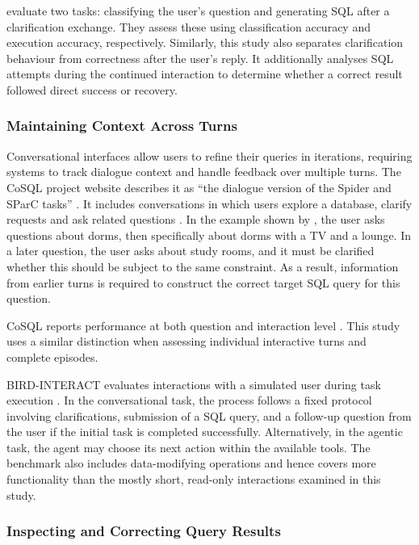 \citet[Section~4]{dong2025practiq} evaluate two tasks:
classifying the user's question and generating SQL after a clarification
exchange. They assess these using classification accuracy and execution
accuracy, respectively.
Similarly, this study also separates clarification behaviour
from correctness after the user's reply.
It additionally analyses SQL attempts during the continued interaction
to determine whether a correct result followed direct success or recovery.

\subsubsection{Maintaining Context Across Turns}

Conversational interfaces allow users to refine their queries in iterations,
requiring systems to track dialogue context and handle feedback over multiple turns.
The CoSQL project website describes it as ``the dialogue version of the
Spider and SParC tasks'' \citep[What is CoSQL?]{cosqlWebsite}.
It includes conversations in which users explore a database, clarify
requests and ask related questions \citep{yu2019cosql}.
In the example shown by \citet[p.~1962, Figure~1]{yu2019cosql},
the user asks questions about dorms, then specifically about dorms with a TV and a lounge.
In a later question, the user asks about study rooms, 
and it must be clarified whether this should be subject to the same constraint. 
As a result, information from earlier turns is required to construct the correct target SQL query for this question.

CoSQL reports performance at both question and interaction level
\citep[Section~6, Table~5]{yu2019cosql}.
This study uses a similar distinction when assessing individual
interactive turns and complete episodes.

BIRD-INTERACT evaluates interactions with a simulated user during task execution
\citep{huo2026birdinteract}.
In the conversational task, the process follows a fixed protocol involving clarifications,
submission of a SQL query, and a follow-up question from the user if the initial task is completed successfully.
Alternatively, in the agentic task, the agent may choose its next action within the available tools.
The benchmark also includes data-modifying operations and hence covers more functionality than the mostly short, read-only interactions
examined in this study.

\subsubsection{Inspecting and Correcting Query Results}

